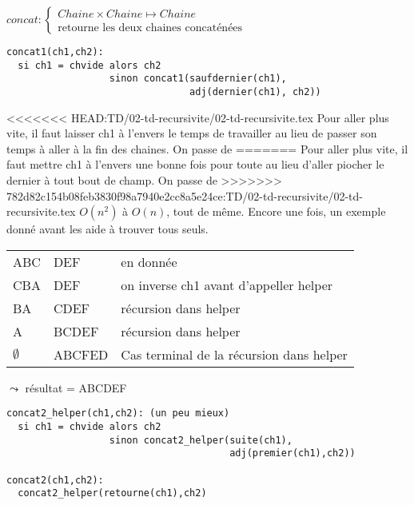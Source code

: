 \documentclass[10pt]{article}\usepackage[correction,nu]{esial}
\begin{document}
\begin{Question}
  $concat: \left\{
    \begin{array}{l}
      Chaine\times Chaine\mapsto Chaine\\
      \text{retourne les deux chaines concaténées}
    \end{array}\right.$  
\end{Question}
\begin{Reponse}
  \begin{Verbatim}[label=version brutale: $O(n^2)$]
concat1(ch1,ch2):
  si ch1 = chvide alors ch2
                  sinon concat1(saufdernier(ch1),
                                adj(dernier(ch1), ch2))
  \end{Verbatim}

<<<<<<< HEAD:TD/02-td-recursivite/02-td-recursivite.tex
  Pour aller plus vite, il faut laisser ch1 à l'envers le temps de travailler
  au lieu de passer son temps à aller à la fin des chaines. On passe de
=======
  Pour aller plus vite, il faut mettre ch1 à l'envers une bonne fois pour toute
  au lieu d'aller piocher le dernier à tout bout de champ. On passe de
>>>>>>> 782d82c154b08feb3830f98a7940e2cc8a5e24ce:TD/02-td-recursivite/02-td-recursivite.tex
  $O(n^2)$ à $O(n)$, tout de même. Encore une fois, un exemple donné avant les
  aide à trouver tous seuls.

  \begin{tabular}{|l l l|}\hline
    ABC&DEF& en donnée\\
    CBA&DEF& on inverse ch1 avant d'appeller helper\\
    BA&CDEF& récursion dans helper\\
    A&BCDEF& récursion dans helper\\
    $\emptyset$&ABCFED& Cas terminal de la récursion dans helper\\\hline
  \end{tabular}$\leadsto$ résultat = ABCDEF

  \begin{Verbatim}[label=version avec helper: $O(n)$]
concat2_helper(ch1,ch2): (un peu mieux)
  si ch1 = chvide alors ch2
                  sinon concat2_helper(suite(ch1),
                                       adj(premier(ch1),ch2))

concat2(ch1,ch2):
  concat2_helper(retourne(ch1),ch2)    
  \end{Verbatim}
\end{Reponse}
\end{document}
